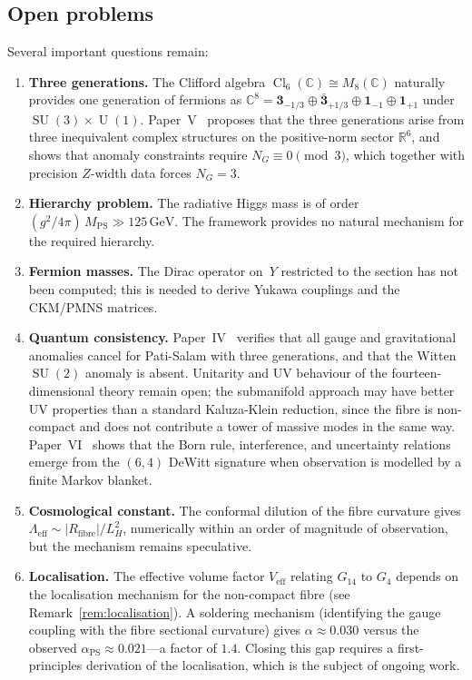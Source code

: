 \documentclass[12pt,a4paper]{article}
\theoremstyle{definition}
\newcommand{\SU}{\operatorname{SU}}
\newcommand{\U}{\operatorname{U}}
\newcommand{\Cl}{\operatorname{Cl}}
\newcommand{\R}{\mathbb{R}}
\newcommand{\C}{\mathbb{C}}
\begin{document}
\subsection{Open problems}

Several important questions remain:

\begin{enumerate}
\item \textbf{Three generations.}
The Clifford algebra $\Cl_6(\C) \cong M_8(\C)$ naturally provides one generation of fermions as $\C^8 = \mathbf{3}_{-1/3} \oplus \bar{\mathbf{3}}_{+1/3} \oplus \mathbf{1}_{-1} \oplus \mathbf{1}_{+1}$ under $\SU(3) \times \U(1)$.
Paper~V~\cite{Paper5} proposes that the three generations arise from three inequivalent complex structures on the positive-norm sector $\R^6$, and shows that anomaly constraints require $N_G \equiv 0 \pmod{3}$, which together with precision $Z$-width data forces $N_G = 3$.

\item \textbf{Hierarchy problem.}
The radiative Higgs mass is of order $(g^2/4\pi)\,M_{\mathrm{PS}} \gg 125\,\text{GeV}$.
The framework provides no natural mechanism for the required hierarchy.

\item \textbf{Fermion masses.}
The Dirac operator on~$Y$ restricted to the section has not been computed; this is needed to derive Yukawa couplings and the CKM/PMNS matrices.

\item \textbf{Quantum consistency.}
Paper~IV~\cite{Paper4} verifies that all gauge and gravitational anomalies cancel for Pati-Salam with three generations, and that the Witten $\SU(2)$ anomaly is absent.
Unitarity and UV behaviour of the fourteen-dimensional theory remain open; the submanifold approach may have better UV properties than a standard Kaluza-Klein reduction, since the fibre is non-compact and does not contribute a tower of massive modes in the same way.
Paper~VI~\cite{Paper6} shows that the Born rule, interference, and uncertainty relations emerge from the $(6,4)$ DeWitt signature when observation is modelled by a finite Markov blanket.

\item \textbf{Cosmological constant.}
The conformal dilution of the fibre curvature gives $\Lambda_{\mathrm{eff}} \sim |R_{\mathrm{fibre}}|/L_H^2$, numerically within an order of magnitude of observation, but the mechanism remains speculative.

\item \textbf{Localisation.}
The effective volume factor $V_{\mathrm{eff}}$ relating $G_{14}$ to $G_4$ depends on the localisation mechanism for the non-compact fibre (see Remark~\ref{rem:localisation}).
A soldering mechanism (identifying the gauge coupling with the fibre sectional curvature) gives $\alpha \approx 0.030$ versus the observed $\alpha_{\mathrm{PS}} \approx 0.021$---a factor of $1.4$.
Closing this gap requires a first-principles derivation of the localisation, which is the subject of ongoing work.
\end{enumerate}
\end{document}
